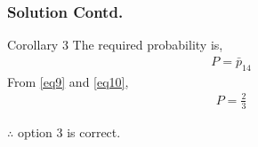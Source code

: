 \documentclass{beamer}
\begin{document}
\begin{frame}
  \frametitle{Solution Contd.} 
   \begin{block}{Corollary 3}
       The required probability is,
\begin{align}
P =\bar p_{14}
\label{eq10}
\end{align}
From \eqref{eq9} and \eqref{eq10},
\begin{align}
P=\frac{2}{3}
\end{align}
   \end{block}
$\therefore$ option 3 is correct.   
\end{frame}
\end{document}
